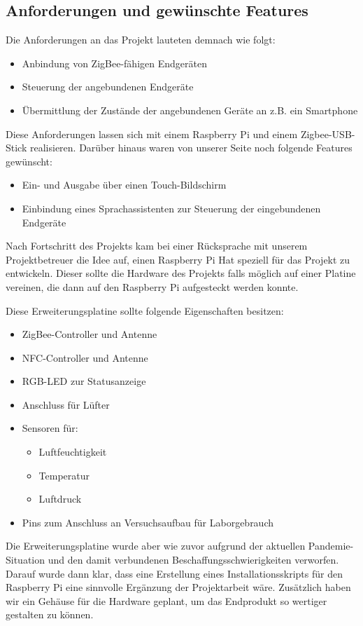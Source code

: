 \documentclass[12pt,a4paper]{article}
\begin{document}
	\subsection{Anforderungen und gewünschte Features}
	Die Anforderungen an das Projekt lauteten demnach wie folgt:
	\begin{itemize}
		\item Anbindung von ZigBee-fähigen Endgeräten
		\item Steuerung der angebundenen Endgeräte
		\item Übermittlung der Zustände der angebundenen Geräte an z.B. ein Smartphone
	\end{itemize}
	Diese Anforderungen lassen sich mit einem Raspberry Pi und einem Zigbee-USB-Stick realisieren. Darüber hinaus waren von unserer Seite noch folgende Features gewünscht:
	\begin{itemize}
		\item Ein- und Ausgabe über einen Touch-Bildschirm
		\item Einbindung eines Sprachassistenten zur Steuerung der eingebundenen Endgeräte
	\end{itemize}
	Nach Fortschritt des Projekts kam bei einer Rücksprache mit unserem Projektbetreuer die Idee auf, einen Raspberry Pi Hat speziell für das Projekt zu entwickeln. Dieser sollte die Hardware des Projekts falls möglich auf einer Platine vereinen, die dann auf den Raspberry Pi aufgesteckt werden konnte.\par
	Diese Erweiterungsplatine sollte folgende Eigenschaften besitzen:
	\begin{itemize}
		\item ZigBee-Controller und Antenne
		\item NFC-Controller und Antenne
		\item RGB-LED zur Statusanzeige
		\item Anschluss für Lüfter
		\item Sensoren für:
		\begin{itemize}
			 \item Luftfeuchtigkeit
			 \item Temperatur
			 \item Luftdruck
		\end{itemize}
		\item Pins zum Anschluss an Versuchsaufbau für Laborgebrauch
	\end{itemize}
	Die Erweiterungsplatine wurde aber wie zuvor aufgrund der aktuellen Pandemie-Situation und den damit verbundenen Beschaffungsschwierigkeiten verworfen.
	Darauf wurde dann klar, dass eine Erstellung eines Installationsskripts für den Raspberry Pi eine sinnvolle Ergänzung der Projektarbeit wäre. Zusätzlich haben wir ein Gehäuse für die Hardware geplant, um das Endprodukt so wertiger gestalten zu können.
	\newpage
\end{document}
